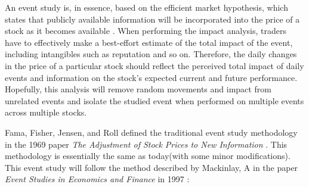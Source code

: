 An event study is, in essence, based on the efficient market hypothesis, which states that publicly available information will be incorporated into the price of a stock as it becomes available \cite{fama1969adjustment}. When performing the impact analysis, traders have to effectively make a best-effort estimate of the total impact of the event, including intangibles such as reputation and so on. Therefore, the daily changes in the price of a particular stock should reflect the perceived total impact of daily events and information on the stock's expected current and future performance. Hopefully, this analysis will remove random movements and impact from unrelated events and isolate the studied event when performed on multiple events across multiple stocks.

Fama, Fisher, Jensen, and Roll defined the traditional event study methodology in the 1969 paper \textit{The Adjustment of Stock Prices to New Information} \cite{fama1969adjustment}. This methodology is essentially the same as today(with some minor modifications). This event study will follow the method described by Mackinlay, A in the paper \textit{Event Studies in Economics and Finance} in 1997 \cite{mackinlay1997event}:

